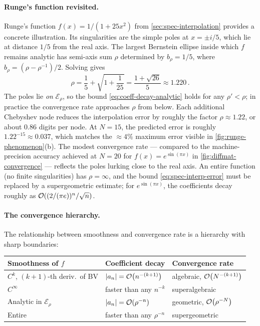 \paragraph{Runge's function revisited.}

Runge's function $f(x) = 1/(1 + 25x^2)$ from
\cref{sec:spec-interpolation} provides a concrete illustration.  Its
singularities are the simple poles at $x = \pm i/5$, which lie at
distance $1/5$ from the real axis.  The largest Bernstein ellipse inside which $f$ remains analytic has
semi-axis sum $\rho$ determined by $b_\rho = 1/5$, where
$b_\rho = (\rho - \rho^{-1})/2$.  Solving gives
%
\begin{equation}
  \rho = \frac{1}{5} + \sqrt{1 + \frac{1}{25}}
  = \frac{1 + \sqrt{26}}{5}
  \approx 1.220 \,.
  \label{eq:runge-rho}
\end{equation}
%
The poles lie \emph{on} $\mathcal{E}_\rho$, so the bound
\cref{eq:coeff-decay-analytic} holds for any $\rho' < \rho$; in
practice the convergence rate approaches $\rho$ from below.
Each additional Chebyshev node reduces the interpolation error by
roughly the factor $\rho \approx 1.22$, or about $0.86$ digits per
node.
At $N = 15$, the predicted error is roughly $1.22^{-15} \approx
0.037$, which matches the $\approx 4\%$ maximum error visible in
\cref{fig:runge-phenomenon}(b).  The modest convergence rate
--- compared to the machine-precision accuracy achieved at $N = 20$ for
$f(x) = e^{\sin(\pi x)}$ in \cref{fig:diffmat-convergence} ---
reflects the poles lurking close to the real axis.  An entire
function (no finite singularities) has $\rho = \infty$, and the bound
\cref{eq:spec-interp-error} must be replaced by a supergeometric
estimate; for $e^{\sin(\pi x)}$, the coefficients decay
roughly as $\mathcal{O}\!\left((2/(\pi e))^n / \sqrt{n}\right)$.

\paragraph{The convergence hierarchy.}

The relationship between smoothness and convergence rate is a
hierarchy with sharp boundaries:

\begin{center}
\begin{tabular}{lll}
  \toprule
  Smoothness of $f$ & Coefficient decay & Convergence rate \\
  \midrule
  $C^k$, $(k{+}1)$-th deriv.\ of BV
    & $\left\lvert a_n \right\rvert = \mathcal{O}\!\left(n^{-(k+1)}\right)$
    & algebraic, $\mathcal{O}\!\left(N^{-(k+1)}\right)$ \\
  $C^\infty$
    & faster than any $n^{-k}$
    & superalgebraic \\
  Analytic in $\mathcal{E}_\rho$
    & $\left\lvert a_n \right\rvert = \mathcal{O}\!\left(\rho^{-n}\right)$
    & geometric, $\mathcal{O}\!\left(\rho^{-N}\right)$ \\
  Entire
    & faster than any $\rho^{-n}$
    & supergeometric \\
  \bottomrule
\end{tabular}
\end{center}

